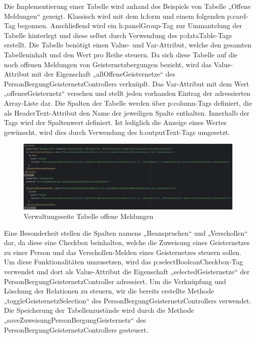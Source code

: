 \documentclass[11pt]{article}
\begin{document}
    \newpage
    Die Implementierung einer Tabelle wird anhand des Beispiels von Tabelle „Offene Meldungen“ gezeigt. Klassisch wird mit dem h:form und einem folgenden p:card-Tag begonnen. Anschließend wird ein h:panelGroup-Tag zur Ummantelung der Tabelle hinterlegt und diese selbst 
    durch Verwendung des p:dataTable-Tags erstellt. Die Tabelle benötigt einen Value- und Var-Attribut, welche den gesamten Tabelleninhalt und den Wert pro Reihe steuern. Da sich diese Tabelle auf die noch offenen Meldungen von Geisternetzbergungen bezieht, wird das Value-Attribut mit der Eigenschaft „allOffeneGeisternetze“ des PersonBergungGeisternetzControllers 
    verknüpft. Das Var-Attribut mit dem Wert „offenesGeisternetz“ versehen und stellt jeden vorhanden Eintrag der adressierten Array-Liste dar.
    Die Spalten der Tabelle werden über p:column-Tags definiert, die als HeaderText-Attribut den Name der jeweiligen Spalte enthalten.
    Innerhalb der Tags wird der Spaltenwert definiert. Ist lediglich die Anzeige eines Wertes gewünscht, wird dies durch Verwendung des h:outputText-Tags umgesetzt. 
    \begin{figure}[H]
        \centering
        \includegraphics[width=\textwidth]{abbildungen/Verwaltungsseite-Xhtml-Offene-Bergungen.png}
        \caption{Verwaltungsseite Tabelle offene Meldungen}
        \label{verwaltungsseite-offene-meldungen}
    \end{figure} 
    Eine Besonderheit stellen die Spalten namens „Beanspruchen“ und „Verschollen“ dar, da diese eine Checkbox beinhalten, welche
    die Zuweisung eines Geisternetzes zu einer Person und das Verschollen-Melden eines Geisternetzes steuern sollen. Um diese Funktionalitäten umzusetzen, wird das p:selectBooleanCheckbox-Tag verwendet und dort als Value-Attribut die Eigenschaft „selectedGeisternetze“ der PersonBergungGeisternetzController adressiert.
    Um die Verknüpfung und Löschung der Relationen zu steuern, wir die bereits erstellte Methode „toggleGeisternetzSelection“ des PersonBergungGeisternetzControllers verwendet.
    Die Speicherung der Tabellenzustände wird durch die Methode „saveZuweisungPersonBergungGeisternetz“ des PersonBergungGeisternetzControllers gesteuert.
    
\end{document}
